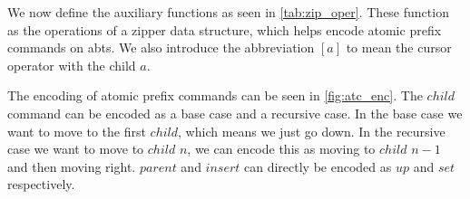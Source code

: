 \documentclass[sigplan,screen]{acmart}
\begin{document}
We now define the auxiliary functions as seen in \cref{tab:zip_oper}. These function as the operations of a zipper data structure, which helps encode atomic prefix commands on abts. We also introduce the abbreviation $[a]$ to mean the cursor operator with the child $a$.

The encoding of atomic prefix commands can be seen in \cref{fig:atc_enc}. The $child$ command can be encoded as a base case and a recursive case. In the base case we want to move to the first $child$, which means we just go down. In the recursive case we want to move to $child$ $n$, we can encode this as moving to $child$ $n-1$ and then moving right. $parent$ and $insert$ can directly be encoded as $up$ and $set$ respectively.
\end{document}
